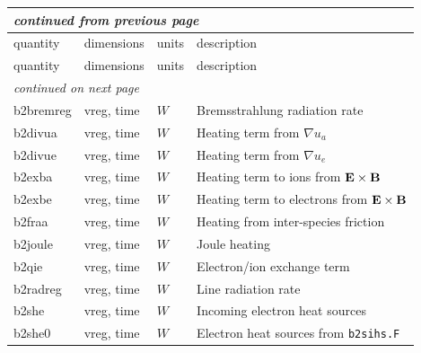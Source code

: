 \documentclass[a4paper,10pt]{report}
\begin{document}
\begin{center}
    \begin{longtable}{|l|l|l|l|}
    \hline
    \multicolumn{4}{|l|}{\small\sl continued from previous page} \\
    \hline quantity & dimensions & units & description \\
    \hline \endhead
    \hline quantity & dimensions & units & description \\
    \hline \endfirsthead
    \hline
    \multicolumn{4}{|l|}{\small\sl continued on next page} \\
    \hline \endfoot
    \endlastfoot
b2bremreg \index{b2bremreg}\index{b2tallies.nc, b2bremreg}                       & vreg, time     & $W$           & Bremsstrahlung radiation rate \\
b2divua \index{b2divua}\index{b2tallies.nc, b2divua}                             & vreg, time     & $W$           & Heating term from $\nabla u_a$ \\
b2divue \index{b2divue}\index{b2tallies.nc, b2divue}                             & vreg, time     & $W$           & Heating term from $\nabla u_e$ \\
b2exba \index{b2exba}\index{b2tallies.nc, b2exba}                                & vreg, time     & $W$           & Heating term to ions from ${\bf E} \times {\bf B}$ \\
b2exbe \index{b2exbe}\index{b2tallies.nc, b2exbe}                                & vreg, time     & $W$           & Heating term to electrons from ${\bf E} \times {\bf B}$ \\
b2fraa \index{b2fraa}\index{b2tallies.nc, b2fraa}                                & vreg, time     & $W$           & Heating from inter-species friction \\
b2joule \index{b2joule}\index{b2tallies.nc, b2joule}                             & vreg, time     & $W$           & Joule heating \\
b2qie \index{b2qie}\index{b2tallies.nc, b2qie}                                   & vreg, time     & $W$           & Electron/ion exchange term \\
b2radreg \index{b2radreg}\index{b2tallies.nc, b2radreg}                          & vreg, time     & $W$           & Line radiation rate \\
b2she \index{b2she}\index{b2tallies.nc, b2she}                                   & vreg, time     & $W$           & Incoming electron heat sources \\
b2she0 \index{b2she0}\index{b2tallies.nc, b2she0}                                & vreg, time     & $W$           & Electron heat sources from {\tt b2sihs.F} \\

\end{longtable}
\end{center}
\end{document}
